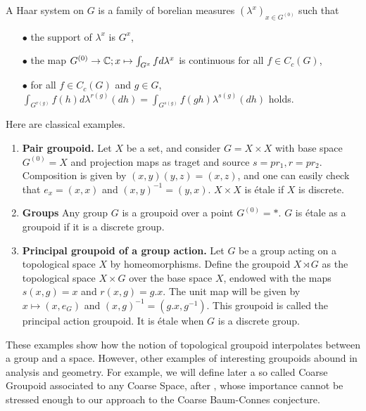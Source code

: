 A Haar system on $G$ is a family of borelian measures $(\lambda^x)_{x\in G^{(0)}}$ such that 
\begin{itemize}
\item[$\bullet$] the support of $\lambda^x$ is $G^x$, 
\item[$\bullet$] the map $G^{(0)} \rightarrow \mathbb C; x\mapsto \int_{G^x} f d\lambda^x$ is continuous for all $f\in C_c(G)$,
\item[$\bullet$] for all $f\in C_c(G)$ and $g\in G$, $\int_{G^{r(g)}} f(h) d\lambda^{r(g)}(dh)= \int_{G^{s(g)}} f(gh) \lambda^{s(g)}(dh)$ holds.
\end{itemize}

\begin{Expl} Here are classical examples.
\begin{enumerate} 
\item \textbf{Pair groupoid.} Let $X$ be a set, and consider $G=X\times X$ with base space $G^{(0)}=X$ and projection maps as traget and source $s=pr_1, r=pr_2$. Composition is given by $(x,y)(y,z)= (x,z)$, and one can easily check that $e_x=(x,x)$ and $(x,y)^{-1} = (y,x)$. $X\times X$ is étale if $X$ is discrete.
\item \textbf{Groups} Any group $G$ is a groupoid over a point $G^{(0)}=*$. $G$ is étale as a groupoid if it is a discrete group.
\item \textbf{Principal groupoid of a group action. } Let $G$ be a group acting on a topological space $X$ by homeomorphisms. Define the groupoid $X\rtimes G$ as the topological space $X\times G$ over the base space $X$, endowed with the maps $s(x,g)=x$ and $r(x,g)=g.x$. The unit map will be given by $x\mapsto (x,e_G)$ and $(x,g)^{-1} = (g.x , g^{-1})$. This groupoid is called the principal action groupoid. It is étale when $G$ is a discrete group.  
\end{enumerate}
\end{Expl}

These examples show how the notion of topological groupoid interpolates between a group and a space. However, other examples of interesting groupoids abound in analysis and geometry. For example, we will define later a so called Coarse Groupoid associated to any Coarse Space, after \cite{SkTuYu}, whose importance cannot be stressed enough to our approach to the Coarse Baum-Connes conjecture.\\

